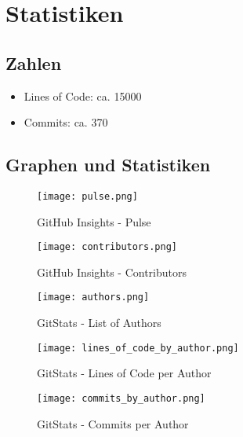 \chapter{Statistiken}

    \section{Zahlen}
        \begin{itemize}
            \item Lines of Code: ca. 15000
            \item Commits: ca. 370
        \end{itemize}
        
    \section{Graphen und Statistiken}

		\begin{figure}[ht] 
			\centering
			\texttt{[image: pulse.png]}
            \caption{GitHub Insights - Pulse}
			\label{fig1}
		\end{figure}

		\begin{figure}[ht] 
			\centering
			\texttt{[image: contributors.png]}
            \caption{GitHub Insights - Contributors}
			\label{fig2}
		\end{figure}

		\begin{figure}[ht] 
    		\centering
			\texttt{[image: authors.png]}
            \caption{GitStats - List of Authors}
			\label{fig3}
		\end{figure}
	
		\begin{figure}[ht] 
			\centering
			\texttt{[image: lines\_of\_code\_by\_author.png]}
            \caption{GitStats - Lines of Code per Author}
			\label{fig4}
		\end{figure}

		\begin{figure}[ht] 
			\centering
			\texttt{[image: commits\_by\_author.png]}
            \caption{GitStats - Commits per Author}	
			\label{fig5}
		\end{figure}
